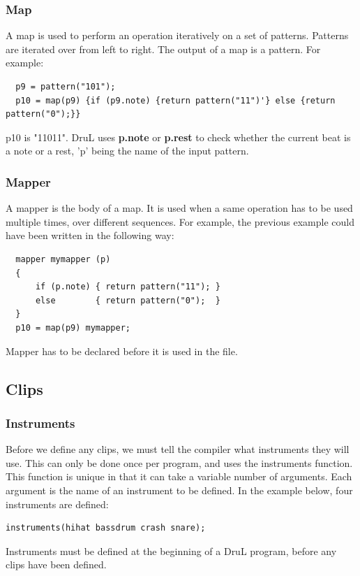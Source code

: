 \documentclass[11pt,twoside]{article}
\begin{document}
\subsubsection{Map}
A map is used to perform an operation iteratively on a set of patterns.
Patterns are iterated over from left to right. The output of a map is
a pattern. For example:
\begin{verbatim}
  p9 = pattern("101");
  p10 = map(p9) {if (p9.note) {return pattern("11")'} else {return  pattern("0");}}
\end{verbatim}
p10 is "11011". DruL uses \textbf{p.note} or \textbf{p.rest} to check whether
the current beat is a note or a rest, 'p' being the name of the input pattern.


\subsubsection{Mapper}
A mapper is the body of a map. It is used when a same operation has to be
used multiple times, over different sequences.
For example, the previous example could have been written in the following
way:
\begin{verbatim}
  mapper mymapper (p)
  {
      if (p.note) { return pattern("11"); }
      else        { return pattern("0");  }
  }
  p10 = map(p9) mymapper;
\end{verbatim}
Mapper has to be declared before it is used in the file.

\subsection{Clips}

\subsubsection{Instruments}

Before we define any clips, we must tell the compiler what instruments they will use.
This can only be done once per program, and uses the instruments function.  This function is unique in that it can take a variable number of arguments.  Each argument is the name of an instrument to be defined.  In the example below, four instruments are defined:

\begin{verbatim}
instruments(hihat bassdrum crash snare);
\end{verbatim}

Instruments must be defined at the beginning of a DruL program, before any clips have been defined.
\end{document}
